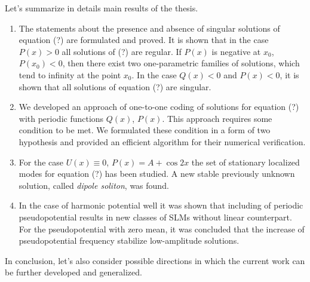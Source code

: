 Let's summarize in details main results of the thesis.
\begin{enumerate}
	\item The statements about the presence and absence of singular solutions of equation {\color{red}(?)} are formulated and proved.
		It is shown that in the case $P(x) > 0$ all solutions of {\color{red}(?)} are regular.
		If $P(x)$ is negative at $x_0$, $P(x_0) < 0$, then there exist two one-parametric families of solutions, which tend to infinity at the point $x_0$.
		In the case $Q(x) < 0$ and $P(x) < 0$, it is shown that all solutions of equation {\color{red}(?)} are singular.
	\item We developed an approach of one-to-one coding of solutions for equation {\color{red}(?)} with periodic functions $Q(x)$, $P(x)$.
		This approach requires some condition to be met.
		We formulated these condition in a form of two hypothesis and provided an efficient algorithm for their numerical verification.
	\item For the case $U(x) \equiv 0$, $P(x) = A + \cos 2x$ the set of stationary localized modes for equation {\color{red}(?)} has been studied.
		A new stable previously unknown solution, called {\it dipole soliton}, was found.
	\item In the case of harmonic potential well it was shown that including of periodic pseudopotential results in new classes of SLMs without linear counterpart.
		For the pseudopotential with zero mean, it was concluded that the increase of pseudopotential frequency stabilize low-amplitude solutions.
\end{enumerate}

In conclusion, let's also consider possible directions in which the current work can be further developed and generalized.